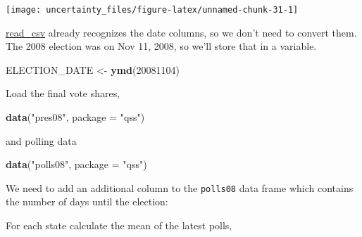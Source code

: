 \documentclass[]{book}
\newenvironment{Shaded}{\begin{snugshade}}{\end{snugshade}}
\newcommand{\DataTypeTok}[1]{\textcolor[rgb]{0.13,0.29,0.53}{#1}}
\newcommand{\DecValTok}[1]{\textcolor[rgb]{0.00,0.00,0.81}{#1}}
\newcommand{\KeywordTok}[1]{\textcolor[rgb]{0.13,0.29,0.53}{\textbf{#1}}}
\newcommand{\NormalTok}[1]{#1}
\newcommand{\OperatorTok}[1]{\textcolor[rgb]{0.81,0.36,0.00}{\textbf{#1}}}
\newcommand{\StringTok}[1]{\textcolor[rgb]{0.31,0.60,0.02}{#1}}
\theoremstyle{definition}
\theoremstyle{definition}
\theoremstyle{definition}
\theoremstyle{remark}
\begin{document}
\begin{center}\texttt{[image: uncertainty\_files/figure-latex/unnamed-chunk-31-1]} \end{center}

\href{https://www.rdocumentation.org/packages/readr/topics/read_csv}{read\_csv}
already recognizes the date columns, so we don't need to convert them.
The 2008 election was on Nov 11, 2008, so we'll store that in a
variable.

\begin{Shaded}
\begin{Highlighting}[]
\NormalTok{ELECTION_DATE <-}\StringTok{ }\KeywordTok{ymd}\NormalTok{(}\DecValTok{20081104}\NormalTok{)}
\end{Highlighting}
\end{Shaded}

Load the final vote shares,

\begin{Shaded}
\begin{Highlighting}[]
\KeywordTok{data}\NormalTok{(}\StringTok{"pres08"}\NormalTok{, }\DataTypeTok{package =} \StringTok{"qss"}\NormalTok{)}
\end{Highlighting}
\end{Shaded}

and polling data

\begin{Shaded}
\begin{Highlighting}[]
\KeywordTok{data}\NormalTok{(}\StringTok{"polls08"}\NormalTok{, }\DataTypeTok{package =} \StringTok{"qss"}\NormalTok{)}
\end{Highlighting}
\end{Shaded}

We need to add an additional column to the \texttt{polls08} data frame
which contains the number of days until the election:

\begin{Shaded}
\end{Shaded}

For each state calculate the mean of the latest polls,
\end{document}
